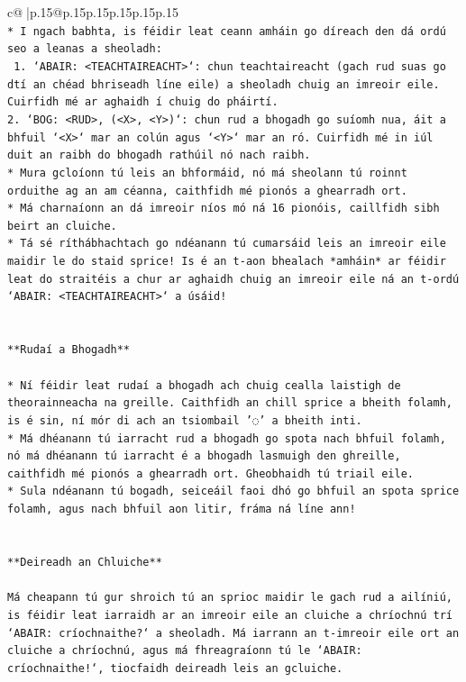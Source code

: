 \documentclass{article}
\begin{document}
{\begin{supertabular}{c@{$\;$}|p{.15\linewidth}@{}p{.15\linewidth}p{.15\linewidth}p{.15\linewidth}p{.15\linewidth}p{.15\linewidth}}
{{{\\ 
\texttt{* I ngach babhta, is féidir leat ceann amháin go díreach den dá ordú seo a leanas a sheoladh:} \\
\texttt{ 1. `ABAIR: <TEACHTAIREACHT>`: chun teachtaireacht (gach rud suas go dtí an chéad bhriseadh líne eile) a sheoladh chuig an imreoir eile. Cuirfidh mé ar aghaidh í chuig do pháirtí.} \\
\texttt{2. `BOG: <RUD>, (<X>, <Y>)`: chun rud a bhogadh go suíomh nua, áit a bhfuil `<X>` mar an colún agus `<Y>` mar an ró. Cuirfidh mé in iúl duit an raibh do bhogadh rathúil nó nach raibh.} \\
\texttt{* Mura gcloíonn tú leis an bhformáid, nó má sheolann tú roinnt orduithe ag an am céanna, caithfidh mé pionós a ghearradh ort.} \\
\texttt{* Má charnaíonn an dá imreoir níos mó ná 16 pionóis, caillfidh sibh beirt an cluiche.} \\
\texttt{* Tá sé ríthábhachtach go ndéanann tú cumarsáid leis an imreoir eile maidir le do staid sprice! Is é an t{-}aon bhealach *amháin* ar féidir leat do straitéis a chur ar aghaidh chuig an imreoir eile ná an t{-}ordú `ABAIR: <TEACHTAIREACHT>` a úsáid!} \\
\\ 
\\ 
\texttt{**Rudaí a Bhogadh**} \\
\\ 
\texttt{* Ní féidir leat rudaí a bhogadh ach chuig cealla laistigh de theorainneacha na greille. Caithfidh an chill sprice a bheith folamh, is é sin, ní mór di ach an tsiombail '◌' a bheith inti.} \\
\texttt{* Má dhéanann tú iarracht rud a bhogadh go spota nach bhfuil folamh, nó má dhéanann tú iarracht é a bhogadh lasmuigh den ghreille, caithfidh mé pionós a ghearradh ort. Gheobhaidh tú triail eile.} \\
\texttt{* Sula ndéanann tú bogadh, seiceáil faoi dhó go bhfuil an spota sprice folamh, agus nach bhfuil aon litir, fráma ná líne ann!} \\
\\ 
\\ 
\texttt{**Deireadh an Chluiche**} \\
\\ 
\texttt{Má cheapann tú gur shroich tú an sprioc maidir le gach rud a ailíniú, is féidir leat iarraidh ar an imreoir eile an cluiche a chríochnú trí `ABAIR: críochnaithe?` a sheoladh. Má iarrann an t{-}imreoir eile ort an cluiche a chríochnú, agus má fhreagraíonn tú le `ABAIR: críochnaithe!`, tiocfaidh deireadh leis an gcluiche.} \\
}}}
\end{supertabular}}
\end{document}
